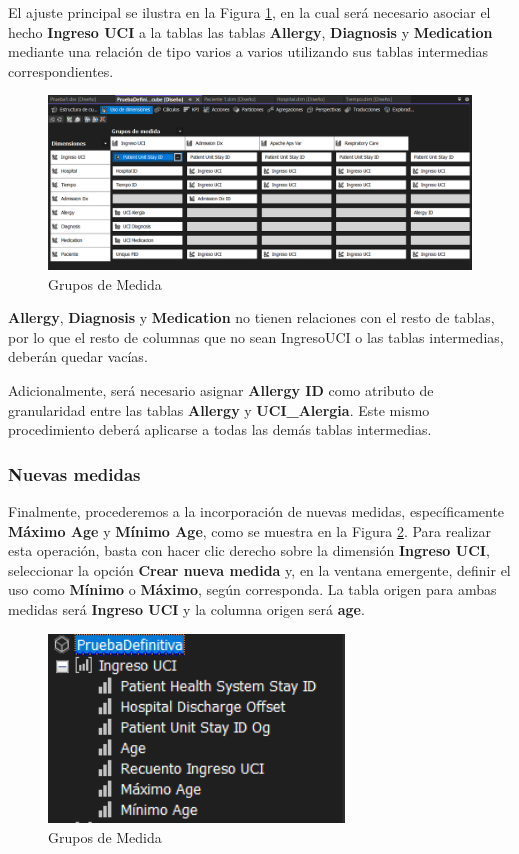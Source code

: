 \documentclass[12pt, a4paper, twoside]{article}
\begin{document}
El ajuste principal se ilustra en la Figura \ref{fig:30}, en la cual será necesario asociar el hecho \textbf{Ingreso UCI} a la tablas  las tablas \textbf{Allergy}, \textbf{Diagnosis} y \textbf{Medication} mediante una relación de tipo varios a varios utilizando sus tablas intermedias correspondientes.

\begin{figure}[H]
	\centering
	\includegraphics[width=1\textwidth]{image/gruposMedida}
	\caption{Grupos de Medida}
	\label{fig:30}
\end{figure}

\textbf{Allergy}, \textbf{Diagnosis} y \textbf{Medication} no tienen relaciones con el resto de tablas, por lo que el resto de columnas que no sean IngresoUCI o las tablas intermedias, deberán quedar vacías.

Adicionalmente, será necesario asignar \textbf{Allergy ID} como atributo de granularidad entre las tablas \textbf{Allergy} y \textbf{UCI\_Alergia}. Este mismo procedimiento deberá aplicarse a todas las demás tablas intermedias.

\subsubsection{Nuevas medidas}

Finalmente, procederemos a la incorporación de nuevas medidas, específicamente \textbf{Máximo Age} y \textbf{Mínimo Age}, como se muestra en la Figura \ref{fig:32}. Para realizar esta operación, basta con hacer clic derecho sobre la dimensión \textbf{Ingreso UCI}, seleccionar la opción \textbf{Crear nueva medida} y, en la ventana emergente, definir el uso como \textbf{Mínimo} o \textbf{Máximo}, según corresponda. La tabla origen para ambas medidas será \textbf{Ingreso UCI} y la columna origen será \textbf{age}.

\begin{figure}[H]
	\centering
	\includegraphics[width=0.7\textwidth]{image/dimensionesNuevas}
	\caption{Grupos de Medida}
	\label{fig:32}
\end{figure}
\end{document}
